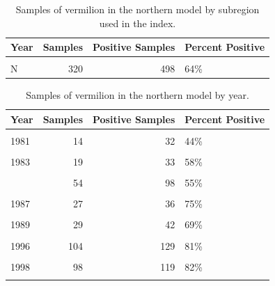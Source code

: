 \documentclass[
  english,
  a4paper,
]{article}
\begin{document}
\newpage

\begin{table}

\caption{\label{tab:tab-region-mrfss}Samples of vermilion in the northern model by subregion used in the index.}
\centering
\begin{tabular}[t]{lrrl}
\toprule
Year & Samples & Positive Samples & Percent Positive\\
\midrule
\cellcolor{gray!6}{C} & \cellcolor{gray!6}{442} & \cellcolor{gray!6}{585} & \cellcolor{gray!6}{76\%}\\
N & 320 & 498 & 64\%\\
\bottomrule
\end{tabular}
\end{table}

\begin{table}

\caption{\label{tab:tab-year-mrfss}Samples of vermilion in the northern model by year.}
\centering
\begin{tabular}[t]{lrrl}
\toprule
Year & Samples & Positive Samples & Percent Positive\\
\midrule
\cellcolor{gray!6}{1980} & \cellcolor{gray!6}{31} & \cellcolor{gray!6}{57} & \cellcolor{gray!6}{54\%}\\
1981 & 14 & 32 & 44\%\\
\cellcolor{gray!6}{1982} & \cellcolor{gray!6}{24} & \cellcolor{gray!6}{41} & \cellcolor{gray!6}{59\%}\\
1983 & 19 & 33 & 58\%\\
\cellcolor{gray!6}{1984} & \cellcolor{gray!6}{34} & \cellcolor{gray!6}{59} & \cellcolor{gray!6}{58\%}\\
\addlinespace
1985 & 54 & 98 & 55\%\\
\cellcolor{gray!6}{1986} & \cellcolor{gray!6}{50} & \cellcolor{gray!6}{87} & \cellcolor{gray!6}{57\%}\\
1987 & 27 & 36 & 75\%\\
\cellcolor{gray!6}{1988} & \cellcolor{gray!6}{38} & \cellcolor{gray!6}{48} & \cellcolor{gray!6}{79\%}\\
1989 & 29 & 42 & 69\%\\
\addlinespace
\cellcolor{gray!6}{1995} & \cellcolor{gray!6}{31} & \cellcolor{gray!6}{41} & \cellcolor{gray!6}{76\%}\\
1996 & 104 & 129 & 81\%\\
\cellcolor{gray!6}{1997} & \cellcolor{gray!6}{127} & \cellcolor{gray!6}{162} & \cellcolor{gray!6}{78\%}\\
1998 & 98 & 119 & 82\%\\
\cellcolor{gray!6}{1999} & \cellcolor{gray!6}{82} & \cellcolor{gray!6}{99} & \cellcolor{gray!6}{83\%}\\
\bottomrule
\end{tabular}
\end{table}
\end{document}
